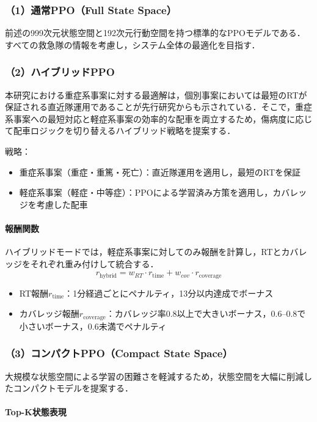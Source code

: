 \subsubsection{（1）通常PPO（Full State Space）}
前述の999次元状態空間と192次元行動空間を持つ標準的なPPOモデルである．すべての救急隊の情報を考慮し，システム全体の最適化を目指す．

\subsubsection{（2）ハイブリッドPPO}
本研究における重症系事案に対する最適解は，個別事案においては最短のRTが保証される直近隊運用であることが先行研究\cite{Carter1972}からも示されている．そこで，重症系事案への最短対応と軽症系事案の効率的な配車を両立するため，傷病度に応じて配車ロジックを切り替えるハイブリッド戦略を提案する．

戦略：
\begin{itemize}
  \item 重症系事案（重症・重篤・死亡）：直近隊運用を適用し，最短のRTを保証
  \item 軽症系事案（軽症・中等症）：PPOによる学習済み方策を適用し，カバレッジを考慮した配車
\end{itemize}

\paragraph{報酬関数}

ハイブリッドモードでは，軽症系事案に対してのみ報酬を計算し，RTとカバレッジをそれぞれ重み付けして統合する．
\[
r_{\text{hybrid}} = w_{RT} \cdot r_{\text{time}} + w_{cov} \cdot r_{\text{coverage}}
\]
\begin{itemize}
  \item RT報酬$r_{\text{time}}$：1分経過ごとにペナルティ，13分以内達成でボーナス
  \item カバレッジ報酬$r_{\text{coverage}}$：カバレッジ率0.8以上で大きいボーナス，0.6--0.8で小さいボーナス，0.6未満でペナルティ
\end{itemize}

\subsubsection{（3）コンパクトPPO（Compact State Space）}
大規模な状態空間による学習の困難さを軽減するため，状態空間を大幅に削減したコンパクトモデルを提案する．

\paragraph{Top-K状態表現}


